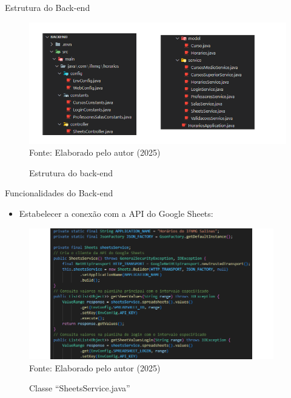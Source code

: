 \begin{frame}{Estrutura do Back-end}
    \begin{figure}
        \centering
        \vspace{-0.5cm}
        \caption{Estrutura do back-end}
        \vspace{-0.2cm}
        \includegraphics[width=1\textwidth]{figuras/back-1.png}
        \\ %
        \footnotesize Fonte: Elaborado pelo autor (2025)
    \end{figure}
\end{frame}

\begin{frame}{Funcionalidades do Back-end}
    \begin{itemize}
        \item Estabelecer a conexão com a API do Google Sheets:
    \end{itemize}
    \begin{figure}
        \centering
        \vspace{-0.4cm}
        \caption{Classe ``SheetsService.java''}
        \vspace{-0.2cm}
        \includegraphics[width=0.95\textwidth]{figuras/back-2.png}
        \\ %
        \footnotesize Fonte: Elaborado pelo autor (2025)
    \end{figure}
\end{frame}


